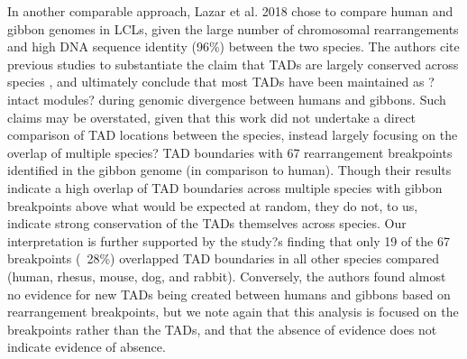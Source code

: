 In another comparable approach, Lazar et al. 2018 \cite{Lazar.2018} chose to compare human and gibbon genomes in LCLs, given the large number of chromosomal rearrangements and high DNA sequence identity (96\%) between the two species. The authors cite previous studies to substantiate the claim that TADs are largely conserved across species \cite{Dixon.2012, Rudan.2015}, and ultimately conclude that most TADs have been maintained as ?intact modules? during genomic divergence between humans and gibbons. Such claims may be overstated, given that this work did not undertake a direct comparison of TAD locations between the species, instead largely focusing on the overlap of multiple species? TAD boundaries with 67 rearrangement breakpoints identified in the gibbon genome (in comparison to human). Though their results indicate a high overlap of TAD boundaries across multiple species with gibbon breakpoints above what would be expected at random, they do not, to us, indicate strong conservation of the TADs themselves across species. Our interpretation is further supported by the study?s finding that only 19 of the 67 breakpoints (~28\%) overlapped TAD boundaries in all other species compared (human, rhesus, mouse, dog, and rabbit). Conversely, the authors found almost no evidence for new TADs being created between humans and gibbons based on rearrangement breakpoints, but we note again that this analysis is focused on the breakpoints rather than the TADs, and that the absence of evidence does not indicate evidence of absence.

